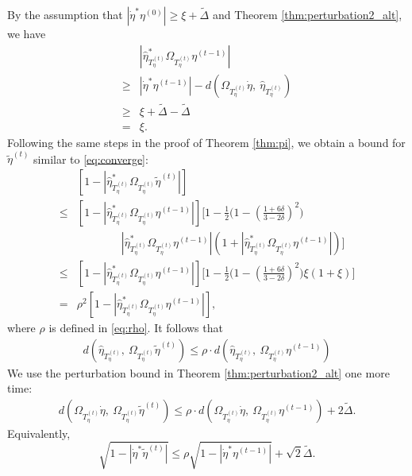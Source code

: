 \documentclass[11pt,journal]{IEEEtran}
\begin{document}
\begin{IEEEproof}
By the assumption that $|\dot{\eta}^*\eta^{(0)}|\geq \xi + \widetilde{\Delta}$ and Theorem \ref{thm:perturbation2_alt}, we have
\begin{align*}
& |\hat{\eta}_{T_\eta^{(t)}}^*\Omega_{T_\eta^{(t)}}\eta^{(t-1)}| \\
\geq & |\dot{\eta}^*\eta^{(t-1)}| - d(\Omega_{T_\eta^{(t)}}\dot{\eta},~\hat{\eta}_{T_\eta^{(t)}}) \\
\geq & \xi + \widetilde{\Delta} - \widetilde{\Delta} \\
= & \xi.
\end{align*}
Following the same steps in the proof of Theorem \ref{thm:pi}, we obtain a bound for $\tilde{\eta}^{(t)}$ similar to \eqref{eq:converge}:
\begin{align*}
& [1 - |\hat{\eta}_{T_\eta^{(t)}}^*\Omega_{T_\eta^{(t)}}\tilde{\eta}^{(t)}|] \\
\leq & [1 - |\hat{\eta}_{T_\eta^{(t)}}^*\Omega_{T_\eta^{(t)}}\eta^{(t-1)}|] \Big[ 1 - \frac{1}{2} \bigl(1-(\frac{1+6\delta}{3-2\delta})^2\bigr) \\
& \qquad\qquad |\hat{\eta}_{T_\eta^{(t)}}^*\Omega_{T_\eta^{(t)}}\eta^{(t-1)}|(1 + |\hat{\eta}_{T_\eta^{(t)}}^*\Omega_{T_\eta^{(t)}}\eta^{(t-1)}|) \Big] \\
\leq & [1 - |\hat{\eta}_{T_\eta^{(t)}}^*\Omega_{T_\eta^{(t)}}\eta^{(t-1)}|] \Big[ 1 - \frac{1}{2} \bigl(1-(\frac{1+6\delta}{3-2\delta})^2\bigr)\xi(1 + \xi) \Big] \\
= & \rho^2 [1 - |\hat{\eta}_{T_\eta^{(t)}}^*\Omega_{T_\eta^{(t)}}\eta^{(t-1)}|],
\end{align*}
where $\rho$ is defined in \eqref{eq:rho}. It follows that
\begin{align*}
d(\hat{\eta}_{T_\eta^{(t)}},~ \Omega_{T_\eta^{(t)}}\tilde{\eta}^{(t)}) \leq \rho \cdot d(\hat{\eta}_{T_\eta^{(t)}},~ \Omega_{T_\eta^{(t)}}\eta^{(t-1)}) 
\end{align*}
We use the perturbation bound in Theorem \ref{thm:perturbation2_alt} one more time:
\begin{align*}
d(\Omega_{T_\eta^{(t)}}\dot{\eta},~ \Omega_{T_\eta^{(t)}}\tilde{\eta}^{(t)}) \leq \rho \cdot d(\Omega_{T_\eta^{(t)}}\dot{\eta},~ \Omega_{T_\eta^{(t)}}\eta^{(t-1)}) + 2\widetilde{\Delta}.
\end{align*}
Equivalently,
\begin{equation}
\label{eq:before_proj}
\sqrt{1 - | \dot{\eta}^*\tilde{\eta}^{(t)} |} \leq \rho \sqrt{1 - | \dot{\eta}^* \eta^{(t-1)} |} + \sqrt{2}\widetilde{\Delta}.
\end{equation}


\end{IEEEproof}
\end{document}
